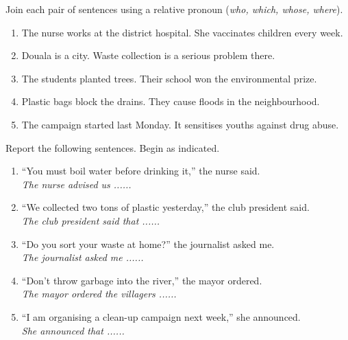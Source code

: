 \documentclass[11pt]{article}
\newcounter{popsec}
\newcounter{popsub}
\newcommand{\courssub}[1]{%
  \stepcounter{popsub}%
  \par\vspace{9pt}\noindent{\popxbold\fontsize{11.5}{13}\selectfont\color{popink}{\color{poporange}\thepopsec.\thepopsub}\hspace{6pt}#1}\par\nopagebreak\vspace{4pt}
}
\begin{document}
\courssub{Je m'entraîne}

\begin{exercice}
Join each pair of sentences using a relative pronoun (\emph{who, which, whose, where}).

\begin{enumerate}
\item The nurse works at the district hospital. She vaccinates children every week.
\item Douala is a city. Waste collection is a serious problem there.
\item The students planted trees. Their school won the environmental prize.
\item Plastic bags block the drains. They cause floods in the neighbourhood.
\item The campaign started last Monday. It sensitises youths against drug abuse.
\end{enumerate}
\end{exercice}

\begin{exercice}
Report the following sentences. Begin as indicated.

\begin{enumerate}
\item ``You must boil water before drinking it,'' the nurse said. \\
\emph{The nurse advised us ......}
\item ``We collected two tons of plastic yesterday,'' the club president said. \\
\emph{The club president said that ......}
\item ``Do you sort your waste at home?'' the journalist asked me. \\
\emph{The journalist asked me ......}
\item ``Don't throw garbage into the river,'' the mayor ordered. \\
\emph{The mayor ordered the villagers ......}
\item ``I am organising a clean-up campaign next week,'' she announced. \\
\emph{She announced that ......}
\end{enumerate}
\end{exercice}
\end{document}
